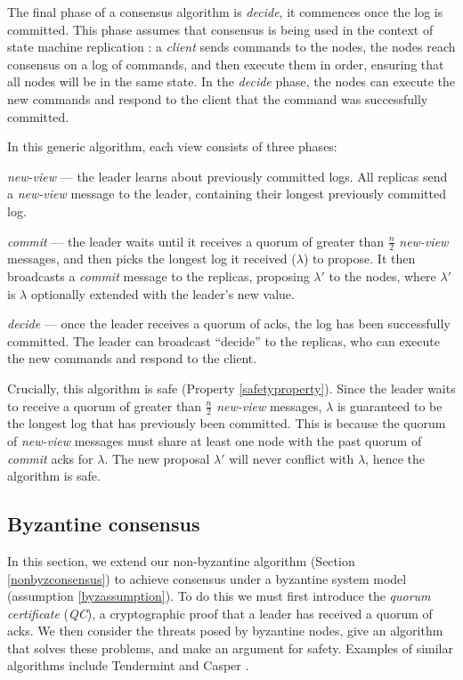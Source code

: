 The final phase of a consensus algorithm is \textit{decide}, it commences once the log is committed. This phase assumes that consensus is being used in the context of state machine replication \cite{lamportTimeClocksOrdering1978,schneiderImplementingFaulttolerantServices1990}: a \textit{client} sends commands to the nodes, the nodes reach consensus on a log of commands, and then execute them in order, ensuring that all nodes will be in the same state. In the \textit{decide} phase, the nodes can execute the new commands and respond to the client that the command was successfully committed.

In this generic algorithm, each view consists of three phases:

\begin{description}
	\item \textit{new-view} --- the leader learns about previously committed logs. All replicas send a \textit{new-view} message to the leader, containing their longest previously committed log.
	\item \textit{commit} --- the leader waits until it receives a quorum of greater than $\frac{n}{2}$ \textit{new-view} messages, and then picks the longest log it received ($\lambda$) to propose. It then broadcasts a \textit{commit} message to the replicas, proposing $\lambda'$ to the nodes, where $\lambda'$ is $\lambda$ optionally extended with the leader's new value.
	\item \textit{decide} --- once the leader receives a quorum of acks, the log has been successfully committed. The leader can broadcast ``decide'' to the replicas, who can execute the new commands and respond to the client.
\end{description}

Crucially, this algorithm is safe (Property \ref{safetyproperty}). Since the leader waits to receive a quorum of greater than $\frac{n}{2}$ \textit{new-view} messages, $\lambda$ is guaranteed to be the longest log that has previously been committed. This is because the quorum of \textit{new-view} messages must share at least one node with the past quorum of \textit{commit} acks for $\lambda$. The new proposal $\lambda'$ will never conflict with $\lambda$, hence the algorithm is safe.

\subsection{Byzantine consensus} \label{byzconsensus}
In this section, we extend our non-byzantine algorithm (Section \ref{nonbyzconsensus}) to achieve consensus under a byzantine system model (assumption \ref{byzassumption}). To do this we must first introduce the \textit{quorum certificate} (\textit{QC}), a cryptographic proof that a leader has received a quorum of acks. We then consider the threats posed by byzantine nodes, give an algorithm that solves these problems, and make an argument for safety. Examples of similar algorithms include Tendermint \cite{kwonTendermintConsensusMining2014} and Casper \cite{buterinCasperFriendlyFinality2019}.

